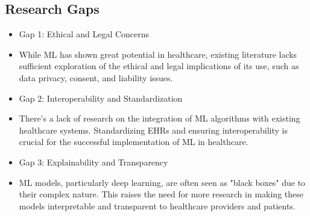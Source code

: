 \documentclass[conference]{IEEEtran}
\begin{document}
\subsection{Research Gaps}
\begin{itemize}
\item Gap 1: Ethical and Legal Concerns
\end{itemize}
\begin{itemize}
\item While ML has shown great potential in healthcare, existing literature lacks sufficient exploration of the ethical and legal implications of its use, such as data privacy, consent, and liability issues.
\end{itemize}
\begin{itemize}
\item Gap 2: Interoperability and Standardization
\end{itemize}
\begin{itemize}
\item There's a lack of research on the integration of ML algorithms with existing healthcare systems. Standardizing EHRs and ensuring interoperability is crucial for the successful implementation of ML in healthcare.
\end{itemize}
\begin{itemize}
\item Gap 3: Explainability and Transparency
\end{itemize}
\begin{itemize}
\item ML models, particularly deep learning, are often seen as "black boxes" due to their complex nature. This raises the need for more research in making these models interpretable and transparent to healthcare providers and patients.
\end{itemize}
\end{document}
